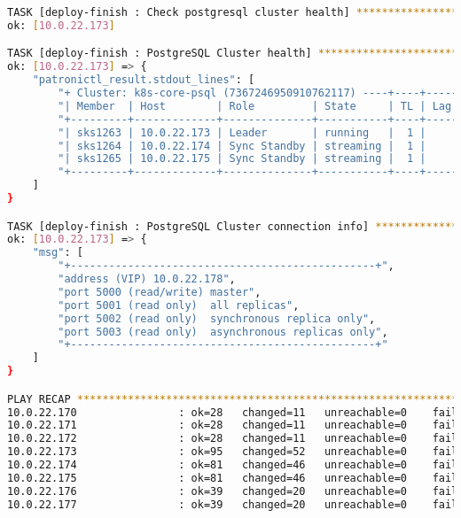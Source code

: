 \begin{flushleft}
\begin{lstlisting}[language=bash, caption=Deploy - Anhang - Deployt,captionpos=b,label={lst:deploy-appendix-deployt},breaklines=true]
TASK [deploy-finish : Check postgresql cluster health] ************************************************************************************************************************************************************
ok: [10.0.22.173]

TASK [deploy-finish : PostgreSQL Cluster health] ******************************************************************************************************************************************************************
ok: [10.0.22.173] => {
    "patronictl_result.stdout_lines": [
        "+ Cluster: k8s-core-psql (7367246950910762117) ----+----+-----------+",
        "| Member  | Host        | Role         | State     | TL | Lag in MB |",
        "+---------+-------------+--------------+-----------+----+-----------+",
        "| sks1263 | 10.0.22.173 | Leader       | running   |  1 |           |",
        "| sks1264 | 10.0.22.174 | Sync Standby | streaming |  1 |         0 |",
        "| sks1265 | 10.0.22.175 | Sync Standby | streaming |  1 |         0 |",
        "+---------+-------------+--------------+-----------+----+-----------+"
    ]
}

TASK [deploy-finish : PostgreSQL Cluster connection info] *********************************************************************************************************************************************************
ok: [10.0.22.173] => {
    "msg": [
        "+------------------------------------------------+",
        "address (VIP) 10.0.22.178",
        "port 5000 (read/write) master",
        "port 5001 (read only)  all replicas",
        "port 5002 (read only)  synchronous replica only",
        "port 5003 (read only)  asynchronous replicas only",
        "+------------------------------------------------+"
    ]
}

PLAY RECAP ********************************************************************************************************************************************************************************************************
10.0.22.170                : ok=28   changed=11   unreachable=0    failed=0    skipped=56   rescued=0    ignored=0
10.0.22.171                : ok=28   changed=11   unreachable=0    failed=0    skipped=49   rescued=0    ignored=0
10.0.22.172                : ok=28   changed=11   unreachable=0    failed=0    skipped=49   rescued=0    ignored=0
10.0.22.173                : ok=95   changed=52   unreachable=0    failed=0    skipped=308  rescued=0    ignored=1
10.0.22.174                : ok=81   changed=46   unreachable=0    failed=0    skipped=294  rescued=0    ignored=1
10.0.22.175                : ok=81   changed=46   unreachable=0    failed=0    skipped=294  rescued=0    ignored=1
10.0.22.176                : ok=39   changed=20   unreachable=0    failed=0    skipped=89   rescued=0    ignored=0
10.0.22.177                : ok=39   changed=20   unreachable=0    failed=0    skipped=83   rescued=0    ignored=0


\end{lstlisting}
\end{flushleft}
